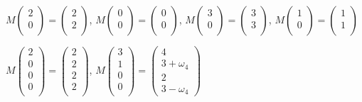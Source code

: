 \documentclass[a4paper,12pt]{article} %
\begin{document}
$M
\begin{pmatrix}
	2\\ 
	0\\
\end{pmatrix}=\begin{pmatrix}
2\\ 
2\\
\end{pmatrix}$, $M
\begin{pmatrix}
0\\ 
0\\
\end{pmatrix}=\begin{pmatrix}
0\\ 
0\\
\end{pmatrix}$, $M
\begin{pmatrix}
3\\ 
0\\
\end{pmatrix}=\begin{pmatrix}
3\\ 
3\\
\end{pmatrix}$, $M
\begin{pmatrix}
1\\ 
0\\
\end{pmatrix}=\begin{pmatrix}
1\\ 
1\\
\end{pmatrix}$

$M
\begin{pmatrix}
2\\  0\\ 0\\ 0\\
\end{pmatrix}=\begin{pmatrix}
2\\  2\\ 2\\ 2\\
\end{pmatrix}$, $M
\begin{pmatrix}
3\\  1\\ 0\\ 0\\
\end{pmatrix}=\begin{pmatrix}
4\\  3+\omega_4\\ 2\\ 3-\omega_4
\end{pmatrix}$
\end{document}
